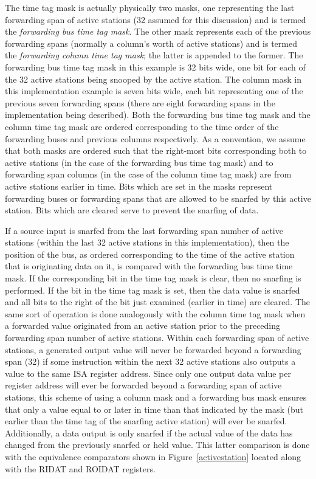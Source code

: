 \documentclass[10pt,dvips]{article}
\begin{document}
The time tag mask is actually physically two masks, one representing
the last forwarding span of active stations (32 assumed for this
discussion) and is termed the {\it forwarding bus time tag mask}.  The
other mask represents each of the previous forwarding spans (normally a
column's worth of active stations) and is termed the {\it forwarding
column time tag mask}; the latter is appended to the former.
The forwarding bus time tag mask in this
example is 32 bits wide, one bit for each of the 32 active stations
being snooped by the active station.  The column mask in this
implementation example is seven bits wide, each bit representing one
of the previous seven forwarding spans (there are eight forwarding
spans in the implementation being described).  Both the forwarding bus
time tag mask and the column time tag mask are ordered corresponding to
the time order of the forwarding buses and previous columns
respectively.  As a convention, we assume that both masks are ordered
such that the right-most bits corresponding both to active stations (in the
case of the forwarding bus time tag mask) and to forwarding span columns
(in the case of the column time tag mask) are from active stations
earlier in time.  Bits which are set in the masks represent forwarding
buses or forwarding spans that are allowed to be snarfed by this active
station.  Bits which are cleared serve to prevent the snarfing of
data.

If a source input is snarfed from the last forwarding span number of
active stations (within the last 32 active stations in this
implementation), then the position of the bus, as ordered corresponding
to the time of the active station that is originating data on it, is
compared with the forwarding bus time time mask.  If the corresponding
bit in the time tag mask is clear, then no snarfing is performed.  If
the bit in the time tag mask is set, then the data value is snarfed and
all bits to the right of the bit just examined (earlier in time) are
cleared.  The same sort of operation is done analogously with the
column time tag mask when a forwarded value originated from an active
station prior to the preceding forwarding span number of active
stations.  Within each forwarding span of active stations, a generated
output value will never be forwarded beyond a forwarding span (32) if
some instruction within the next 32 active stations also outputs a
value to the same ISA register address.  Since only one output data
value per register address
will ever be forwarded beyond a forwarding span of active
stations, this scheme of using a column mask and a forwarding bus mask
ensures that only a value equal to or later in time than that indicated
by the mask (but earlier than
the time tag of the snarfing active station) will ever be snarfed.
Additionally, a data output is only snarfed if the actual value of the
data has changed from the previously snarfed or held value.  This
latter comparison is done with the equivalence comparators shown in
Figure~\ref{activestation} located along with the RIDAT and ROIDAT
registers.
\end{document}
